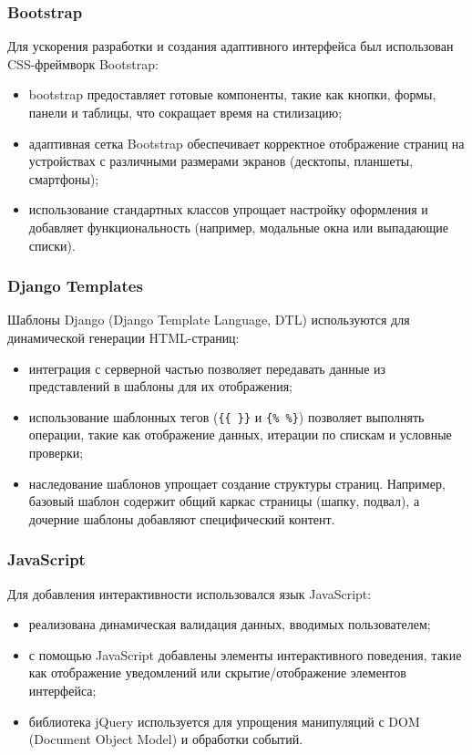 {\subsubsection*{Bootstrap}
Для ускорения разработки и создания адаптивного интерфейса был использован CSS-фреймворк Bootstrap:
\begin{itemize}
    \item bootstrap предоставляет готовые компоненты, такие как кнопки, формы, панели и таблицы, что сокращает время на стилизацию;
    \item адаптивная сетка Bootstrap обеспечивает корректное отображение страниц на устройствах с различными размерами экранов (десктопы, планшеты, смартфоны);
    \item использование стандартных классов упрощает настройку оформления и добавляет функциональность (например, модальные окна или выпадающие списки).
\end{itemize}

\subsubsection*{Django Templates}
Шаблоны Django (Django Template Language, DTL) используются для динамической генерации HTML-страниц:
\begin{itemize}
    \item интеграция с серверной частью позволяет передавать данные из представлений в шаблоны для их отображения;
    \item использование шаблонных тегов (\texttt{\{\{\ \}\}} и \texttt{\{\%\ \%\}}) позволяет выполнять операции, такие как отображение данных, итерации по спискам и условные проверки;
    \item наследование шаблонов упрощает создание структуры страниц. Например, базовый шаблон содержит общий каркас страницы (шапку, подвал), а дочерние шаблоны добавляют специфический контент.
\end{itemize}

\subsubsection*{JavaScript}
Для добавления интерактивности использовался язык JavaScript:
\begin{itemize}
    \item реализована динамическая валидация данных, вводимых пользователем;
    \item с помощью JavaScript добавлены элементы интерактивного поведения, такие как отображение уведомлений или скрытие/отображение элементов интерфейса;
    \item библиотека jQuery используется для упрощения манипуляций с DOM (Document Object Model) и обработки событий.
\end{itemize}

}
